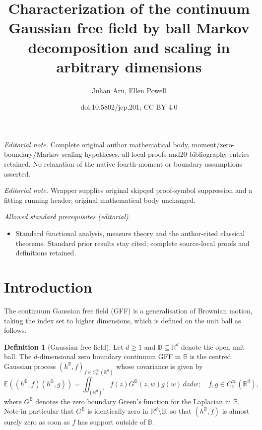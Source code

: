 \documentclass[10pt]{amsart}
\title{Characterization of the continuum Gaussian free field by ball Markov decomposition and scaling in arbitrary dimensions}
\author{Juhan Aru, Ellen Powell}
\date{doi:10.5802/jep.201; CC BY 4.0}
\theoremstyle{definition}
\newtheorem{definition}[theorem]{Definition}
\newcommand{\R}{\mathbb{R}}
\newcommand{\E}{\mathbb{E}}
\newcommand{\B}{\mathbb{B}}\let\D\B\let\Ub\B
\begin{document}
\maketitle
\noindent\textit{Editorial note.} Complete original author mathematical body, moment/zero-boundary/Markov-scaling hypotheses, all local proofs and20 bibliography entries retained. No relaxation of the native fourth-moment or boundary assumptions asserted.\par\medskip
\noindent\textit{Editorial note.} Wrapper supplies original skipqed proof-symbol suppression and a fitting running header; original mathematical body unchanged.\par\medskip
\noindent\textit{Allowed standard prerequisites (editorial).}\begin{itemize}
\item Standard functional analysis, measure theory and the author-cited classical theorems. Standard prior results stay cited; complete source-local proofs and definitions retained.
\end{itemize}\medskip
\vspace*{-\baselineskip}
\tableofcontents

\vspace*{-2\baselineskip}
\mbox{}

\section{Introduction}
The continuum Gaussian free field (GFF) is a generalisation of Brownian motion, taking the index set to higher dimensions, which is defined on the unit ball as follows.

\begin{definition}[Gaussian free field]
Let $d \geq 1$ and $\D \subseteq \R^d$ denote the open unit ball. The $d$-dimensional zero boundary continuum GFF in $\D$ is the centred Gaussian process $(h^{\D},f)_{f\in C_c^\infty(\R^d)}$ whose covariance is given by
\[
\E((h^{\D},f)(h^{\D},g)) = \iint_{(\R^d)^2} f(z)G^{\B}(z,w)g(w)\, dz dw;\quad f,g\in C_c^\infty(\R^d),
\]
where $G^{\D}$ denotes the zero boundary Green's function for the Laplacian in $\D$. Note in particular that $G^\D$ is identically zero in $\R^d\setminus \D$, so that $(h^\B,f)$ is almost surely zero as soon as $f$ has support outside of $\D$.
\end{definition}
\end{document}
